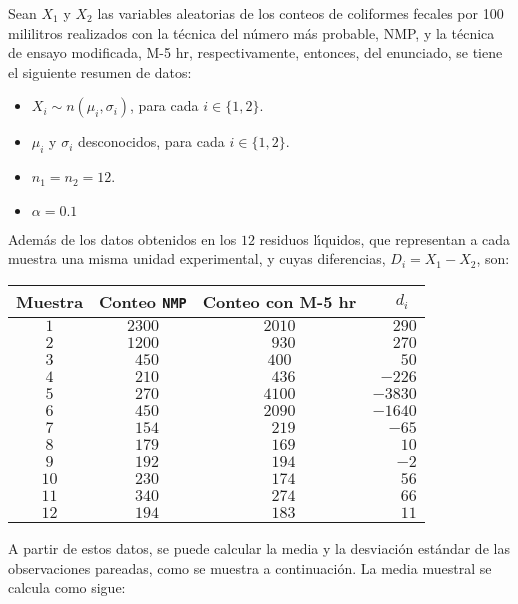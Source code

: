 \begin{solucion}
 Sean $X_1$ y $X_2$ las variables aleatorias de los conteos de coliformes fecales por 100 mililitros realizados con la t\'ecnica del n\'umero m\'as probable, NMP, y la t\'ecnica de ensayo modificada, M-5 hr, respectivamente, entonces, del enunciado, se tiene el siguiente resumen de datos:
 \begin{itemize}
  \item $X_i \sim n\left( \mu_i, \sigma_i \right)$, para cada $i \in \{ 1,2 \}$.
  \item $\mu_i$ y $\sigma_i$ desconocidos, para cada $i \in \{ 1,2 \}$.
  \item $n_1 = n_2 = 12$.
  \item $\alpha = 0.1$
 \end{itemize}
 Adem\'as de los datos obtenidos en los $12$ residuos l\'{\i}quidos, que representan a cada muestra una misma unidad experimental, y cuyas diferencias, $D_i = X_1 - X_2$, son:
 \begin{center}
  \begin{tabular}{cccr}
   \textbf{Muestra} & \textbf{Conteo \texttt{NMP}} & \textbf{Conteo con M-5 hr} & $d_i\,\,\,$ \\
   \hline 
   $1$ & $2300$ & $2010$ & $290$ \\
   $2$ & $1200$ & $\phantom{2}930$ & $270$ \\
   $3$ & $\phantom{1}450$ & $400$ & $\phantom{-22}50$ \\
   $4$ & $\phantom{1}210$ & $\phantom{2}436$ & $-226$ \\
   $5$ & $\phantom{1}270$ & $4100$ & $-3830$ \\
   $6$ & $\phantom{1}450$ & $2090$ & $-1640$ \\
   $7$ & $\phantom{1}154$ & $\phantom{2}219$ & $-65$ \\
   $8$ & $\phantom{1}179$ & $\phantom{2}169$ & $10$ \\
   $9$ & $\phantom{1}192$ & $\phantom{2}194$ & $-2$ \\
   $10$ & $\phantom{1}230$ & $\phantom{2}174$ & $56$ \\
   $11$ & $\phantom{1}340$ & $\phantom{2}274$ & $66$ \\
   $12$ & $\phantom{1}194$ & $\phantom{2}183$ & $11$ \\
  \end{tabular}
 \end{center}
 A partir de estos datos, se puede calcular la media y la desviaci\'on est\'andar de las observaciones pareadas, como se muestra a continuaci\'on. La media muestral se calcula como sigue:

\end{solucion}
